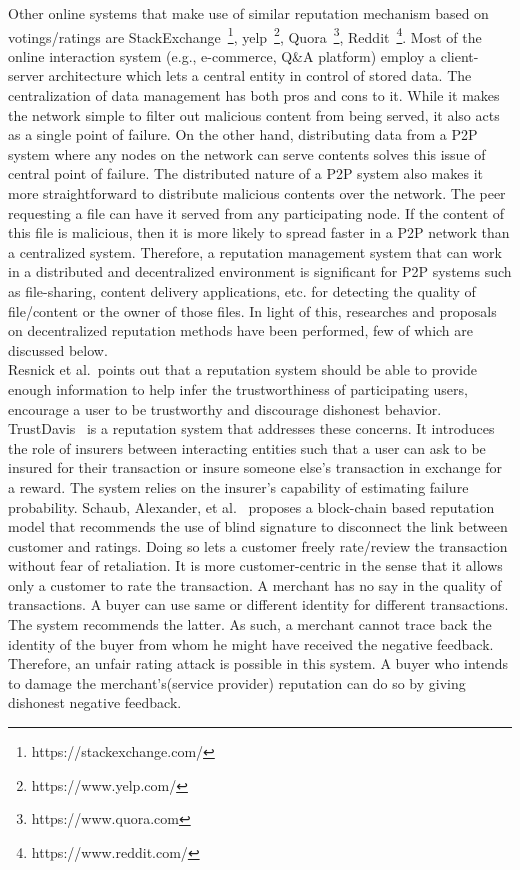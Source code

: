 Other online systems that make use of similar reputation mechanism based on
votings/ratings are StackExchange~\footnote{https://stackexchange.com/},
yelp~\footnote{https://www.yelp.com/}, Quora~\footnote{https://www.quora.com},
Reddit~\footnote{https://www.reddit.com/}. Most of the online interaction
system (e.g., e-commerce, Q\&A platform) employ a client-server architecture
which lets a central entity in control of stored data. The centralization of
data management has both pros and cons to it. While it makes the network simple
to filter out malicious content from being served, it also acts as a single
point of failure. On the other hand, distributing data from a P2P system where
any nodes on the network can serve contents solves this issue of central point
of failure. The distributed nature of a P2P system also makes it more
straightforward to distribute malicious contents over the network. The peer
requesting a file can have it served from any participating node. If the
content of this file is malicious, then it is more likely to spread faster in a
P2P network than a centralized system. Therefore, a reputation management
system that can work in a distributed and decentralized environment is
significant for P2P systems such as file-sharing, content delivery
applications, etc. for detecting the quality of file/content or the owner of
those files. In light of this, researches and proposals on decentralized
reputation methods have been performed, few of which are discussed below.\\ 

Resnick et al.~\cite{resnick2000reputation}points out that a reputation system
should be able to provide enough information to help infer the trustworthiness
of participating users, encourage a user to be trustworthy and discourage
dishonest behavior. TrustDavis~\cite{defigueiredo2005trustdavis} is a
reputation system that addresses these concerns. It introduces the role of
insurers between interacting entities such that a user can ask to be insured
for their transaction or insure someone else's transaction in exchange for a
reward. The system relies on the insurer's capability of estimating failure
probability. Schaub, Alexander, et al.~\cite{schaub2016trustless} proposes a
block-chain based reputation model that recommends the use of blind signature
to disconnect the link between customer and ratings. Doing so lets a customer
freely rate/review the transaction without fear of retaliation. It is more
customer-centric in the sense that it allows only a customer to rate the
transaction. A merchant has no say in the quality of transactions. A buyer can
use same or different identity for different transactions. The system
recommends the latter. As such, a merchant cannot trace back the identity of
the buyer from whom he might have received the negative feedback. Therefore, an
unfair rating attack is possible in this system. A buyer who intends to damage
the merchant's(service provider) reputation can do so by giving dishonest
negative feedback. 


